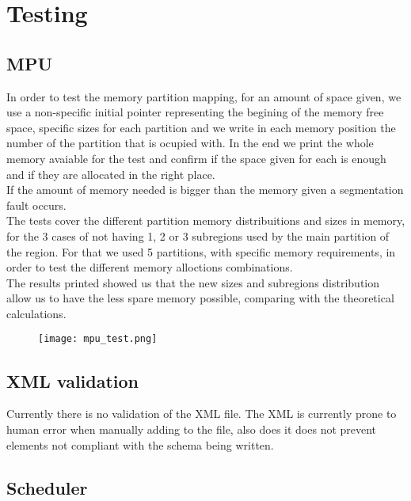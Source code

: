 \chapter{Testing}

\section{MPU}
In order to test the memory partition mapping, for an amount of space given, we use a non-specific initial
 pointer representing the begining of the memory free space, specific sizes for each partition and we
  write in each memory position the number of the partition that is ocupied with. In the end we print the
   whole memory avaiable for the test and confirm if the space given for each is enough and if they are
    allocated in the right place.\\
  If the amount of memory needed is bigger than the memory given a segmentation fault occurs.\\
 The tests cover the different partition memory distribuitions and sizes in memory, for the 3 cases of not
  having 1, 2 or  3 subregions used by the main partition of the region. For that we used 5 partitions, with
   specific memory requirements, in order to test the different memory alloctions combinations.\\
  The results printed showed us that the new sizes and subregions distribution allow us to have the less 
  spare memory possible, comparing with the theoretical calculations.\\
\begin{figure}[H]
\centering
\texttt{[image: mpu\_test.png]}
\label{fig:simple_system}
\end{figure}

\section{XML validation}

Currently there is no validation of the XML file. 
The XML is currently prone to human error when manually 
adding to the file, also does it does not prevent elements 
not compliant with the schema being written. 
\\


\section{Scheduler}

